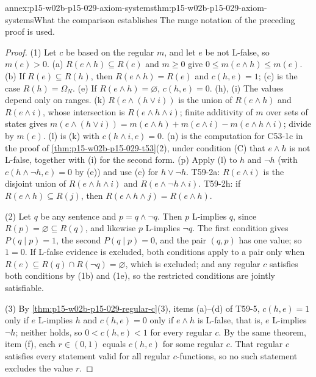 \begin{annexitem}{annex:p15-w02b-p15-029-axiom-systems}{thm:p15-w02b-p15-029-axiom-systems}{What the comparison establishes}
The range notation of the preceding proof is used.
\begin{proof}
(1) Let \(c\) be based on the regular \(m\), and let \(e\) be not
L-false, so \(m(e)>0\). (a) \(R(e\land h)\subseteq R(e)\) and \(m\geq0\)
give \(0\leq m(e\land h)\leq m(e)\). (b) If \(R(e)\subseteq R(h)\), then
\(R(e\land h)=R(e)\) and \(c(h,e)=1\); (c) is the case
\(R(h)=\Omega_N\). (e) If \(R(e\land h)=\varnothing\), \(c(h,e)=0\).
(h), (i) The values depend only on ranges. (k) \(R(e\land(h\lor i))\) is
the union of \(R(e\land h)\) and \(R(e\land i)\), whose intersection is
\(R(e\land h\land i)\); finite additivity of \(m\) over sets of states
gives
\(m(e\land(h\lor i))=m(e\land h)+m(e\land i)-m(e\land h\land i)\);
divide by \(m(e)\). (l) is (k) with \(c(h\land i,e)=0\). (n) is the
computation for C53-1c in the proof of
\cref{thm:p15-w02b-p15-029-t53}(2), under condition (C) that
\(e\land h\) is not L-false, together with (i) for the second form.
(p) Apply (l) to \(h\) and \(\neg h\) (with \(c(h\land\neg h,e)=0\) by
(e)) and use (c) for \(h\lor\neg h\). T59-2a: \(R(e\land i)\) is the
disjoint union of \(R(e\land h\land i)\) and \(R(e\land\neg h\land i)\).
T59-2h: if \(R(e\land h)\subseteq R(j)\), then
\(R(e\land h\land j)=R(e\land h)\).

(2) Let \(q\) be any sentence and \(p=q\land\neg q\). Then \(p\)
L-implies \(q\), since \(R(p)=\varnothing\subseteq R(q)\), and likewise
\(p\) L-implies \(\neg q\). The first condition gives
\(P(q\mid p)=1\), the second \(P(q\mid p)=0\), and the pair
\((q,p)\) has one value; so \(1=0\). If L-false evidence is excluded,
both conditions apply to a pair only when \(R(e)\subseteq R(q)\cap
R(\neg q)=\varnothing\), which is excluded; and any regular \(c\)
satisfies both conditions by (1b) and (1e), so the restricted conditions
are jointly satisfiable.

(3) By \cref{thm:p15-w02b-p15-029-regular-c}(3), items (a)--(d) of
T59-5, \(c(h,e)=1\) only if \(e\) L-implies \(h\) and \(c(h,e)=0\)
only if \(e\land h\) is L-false, that is, \(e\) L-implies \(\neg h\);
neither holds, so \(0<c(h,e)<1\) for every regular \(c\). By the same
theorem, item (f), each \(r\in(0,1)\) equals \(c(h,e)\) for some
regular \(c\). That regular \(c\) satisfies every statement valid for
all regular \(c\)-functions, so no such statement excludes the value
\(r\).
\end{proof}
\end{annexitem}

